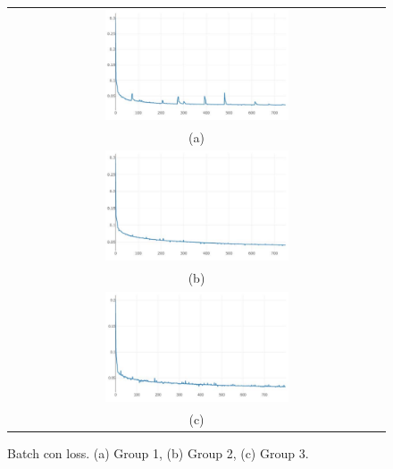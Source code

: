 \documentclass[10pt,twocolumn,letterpaper]{article}
\begin{document}
\begin{figure}%
\centering\begin{tabular}{c}
\includegraphics[width=0.5\textwidth]{fig8-a}\\
(a)\\[3ex]%
\includegraphics[width=0.5\textwidth]{fig8-b}\\
(b)\\[3ex]
\includegraphics[width=0.5\textwidth]{fig8-c}\\
(c)
\end{tabular}
\caption{Batch con loss. (a) Group 1, (b) Group 2, (c) Group 3.}%
\label{fig8}%
\end{figure}
\end{document}
